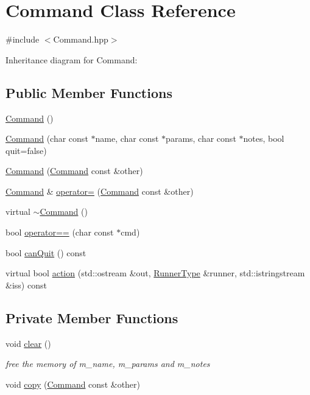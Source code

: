 \hypertarget{classCommand}{}\section{Command Class Reference}
\label{classCommand}


{\ttfamily \#include $<$Command.\+hpp$>$}



Inheritance diagram for Command\+:
\subsection*{Public Member Functions}
\begin{DoxyCompactItemize}
\item 
\hyperlink{classCommand_a18df2d81039392daeb0b78c346a70537}{Command} ()
\item 
\hyperlink{classCommand_ac26b14828c5a72f9bd370421a4788b5d}{Command} (char const $\ast$name, char const $\ast$params, char const $\ast$notes, bool quit=false)
\item 
\hyperlink{classCommand_a8ccab91a784c447f628ee8fec3873494}{Command} (\hyperlink{classCommand}{Command} const \&other)
\item 
\hyperlink{classCommand}{Command} \& \hyperlink{classCommand_a378451c967b9d585492a778bab58f803}{operator=} (\hyperlink{classCommand}{Command} const \&other)
\item 
virtual \hyperlink{classCommand_ab552bb3a07fdd1acbfd8ea76e69b2278}{$\sim$\+Command} ()
\item 
bool \hyperlink{classCommand_a75d6d67687c9d29e47ce9e80540bbd1e}{operator==} (char const $\ast$cmd)
\item 
bool \hyperlink{classCommand_a0ec10c9753786caf083aba08cf85afb0}{can\+Quit} () const
\item 
virtual bool \hyperlink{classCommand_ac423f5674fc858c0cc42f494943bc0d0}{action} (std\+::ostream \&out, \hyperlink{Command_8hpp_ad45c3de597c2023a8be0399d914161f4}{Runner\+Type} \&runner, std\+::istringstream \&iss) const
\end{DoxyCompactItemize}
\subsection*{Private Member Functions}
\begin{DoxyCompactItemize}
\item 
void \hyperlink{classCommand_a57fbea0c0d10ef4b184c7ef3eb34590d}{clear} ()
\begin{DoxyCompactList}\small\item\em free the memory of m\+\_\+name, m\+\_\+params and m\+\_\+notes \end{DoxyCompactList}\item 
void \hyperlink{classCommand_afc097ed76cb9fd7135146ec8703e2c3e}{copy} (\hyperlink{classCommand}{Command} const \&other)
\end{DoxyCompactItemize}
